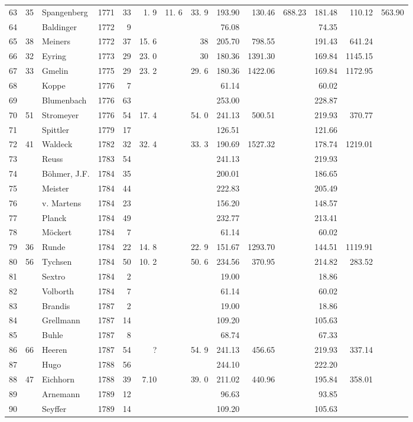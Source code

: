 \begin{center}
\begin{tabular}{|r|r|l|r|r|r|r|r|r|r|r|r|r|r|}
63&35&Spangenberg&1771&33&1. 9&11. 6&33. 9&193.90&130.46&688.23&181.48&110.12&563.90\\
64&&Baldinger&1772&9&&&&76.08&&&74.35&&\\
65&38&Meiners&1772&37&15. 6&&38&205.70&798.55&&191.43&641.24&\\
66&32&Eyring&1773&29&23. 0&&30&180.36&1391.30&&169.84&1145.15&\\
67&33&Gmelin&1775&29&23. 2&&29. 6&180.36&1422.06&&169.84&1172.95&\\
68&&Koppe&1776&7&&&&61.14&&&60.02&&\\
69&&Blumenbach&1776&63&&&&253.00&&&228.87&&\\
70&51&Stromeyer&1776&54&17. 4&&54. 0&241.13&500.51&&219.93&370.77&\\[3pt]
71&&Spittler&1779&17&&&&126.51&&&121.66&&\\
72&41&Waldeck&1782&32&32. 4&&33. 3&190.69&1527.32&&178.74&1219.01&\\
73&&Reuss&1783&54&&&&241.13&&&219.93&&\\
74&&Böhmer, J.F.&1784&35&&&&200.01&&&186.65&&\\
75&&Meister&1784&44&&&&222.83&&&205.49&&\\
76&&v. Martens&1784&23&&&&156.20&&&148.57&&\\
77&&Planck&1784&49&&&&232.77&&&213.41&&\\
78&&Möckert&1784&7&&&&61.14&&&60.02&&\\
79&36&Runde&1784&22&14. 8&&22. 9&151.67&1293.70&&144.51&1119.91&\\
80&56&Tychsen&1784&50&10. 2&&50. 6&234.56&370.95&&214.82&283.52&\\[3pt]
81&&Sextro&1784&2&&&&19.00&&&18.86&&\\
82&&Volborth&1784&7&&&&61.14&&&60.02&&\\
83&&Brandis&1787&2&&&&19.00&&&18.86&&\\
84&&Grellmann&1787&14&&&&109.20&&&105.63&&\\
85&&Buhle&1787&8&&&&68.74&&&67.33&&\\
86&66&Heeren&1787&54&?&&54. 9&241.13&456.65&&219.93&337.14&\\
87&&Hugo&1788&56&&&&244.10&&&222.20&&\\
88&47&Eichhorn&1788&39&7.10&&39. 0&211.02&440.96&&195.84&358.01&\\
89&&Arnemann&1789&12&&&&96.63&&&93.85&&\\
90&&Seyffer&1789&14&&&&109.20&&&105.63&&\\\hline
\end{tabular}
\end{center}

